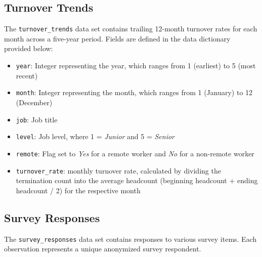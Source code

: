 \documentclass[
]{book}
\providecommand{\tightlist}{%
  \setlength{\itemsep}{0pt}\setlength{\parskip}{0pt}}
\begin{document}
\hypertarget{turnover-trends}{%
\subsection{Turnover Trends}\label{turnover-trends}}

The \texttt{turnover\_trends} data set contains trailing 12-month turnover rates for each month across a five-year period. Fields are defined in the data dictionary provided below:

\begin{itemize}
\tightlist
\item
  \texttt{year}: Integer representing the year, which ranges from 1 (earliest) to 5 (most recent)
\item
  \texttt{month}: Integer representing the month, which ranges from 1 (January) to 12 (December)
\item
  \texttt{job}: Job title
\item
  \texttt{level}: Job level, where 1 = \emph{Junior} and 5 = \emph{Senior}
\item
  \texttt{remote}: Flag set to \emph{Yes} for a remote worker and \emph{No} for a non-remote worker
\item
  \texttt{turnover\_rate}: monthly turnover rate, calculated by dividing the termination count into the average headcount (beginning headcount + ending headcount / 2) for the respective month
\end{itemize}

\hypertarget{survey-responses}{%
\subsection{Survey Responses}\label{survey-responses}}

The \texttt{survey\_responses} data set contains responses to various survey items. Each observation represents a unique anonymized survey respondent.
\end{document}
